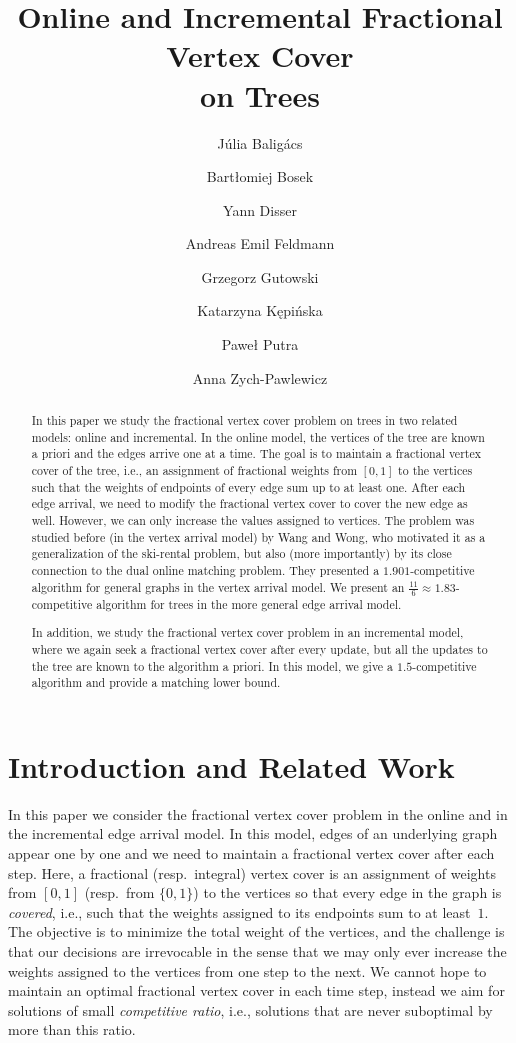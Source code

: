 \documentclass[a4paper,USenglish,cleveref,autoref,thm-restate,pdfa]{lipics-v2021}
\title{Online and Incremental Fractional Vertex Cover\\ on Trees}
\author{Júlia Baligács}
{Department of Computer Science, University of Oxford, United Kingdom}
{jbaligacs@gmail.com}
{https://orcid.org/0000-0003-2654-149X}
{During employment in Warsaw supported by ERC grant BOBR (grant no.~948057).
During employment in Oxford supported by ERC grant CCOO (grant no.~101165139).}
\author{Bart{\l}omiej Bosek}
{Institute~of~Theoretical~Computer~Science, Faculty~of~Mathematics~and~Computer~Science, Jagiellonian~University, Krak{\'o}w, Poland}
{bartlomiej.bosek@uj.edu.pl}
{https://orcid.org/0000-0001-8756-3663}
{}
\author{Yann Disser}
{Department~of~Mathematics, TU Darmstadt, Germany}
{disser@mathematik.tu-darmstadt.de}
{https://orcid.org/0000-0002-2085-0454}
{}
\author{Andreas Emil Feldmann}
{Department of Computer Science, University of Sheffield, United Kingdom}
{feldmann.a.e+web@gmail.com}
{https://orcid.org/0000-0001-6229-5332}
{}
\author{Grzegorz Gutowski}
{Institute~of~Theoretical~Computer~Science, Faculty~of~Mathematics~and~Computer~Science, Jagiellonian~University, Krak{\'o}w, Poland}
{grzegorz.gutowski@uj.edu.pl}
{https://orcid.org/0000-0003-3313-1237}
{}
\author{Katarzyna Kępińska}
{Institute~of~Theoretical~Computer~Science, Faculty~of~Mathematics~and~Computer~Science, Jagiellonian~University, Krak{\'o}w, Poland}
{katarzyna.kepinska@alumni.uj.edu.pl}
{}
{}
\author{Paweł Putra}
{Institute of Informatics, University of Warsaw, Poland}
{p.putra@uw.edu.pl}
{https://orcid.org/0009-0006-3703-680X}
{}
\author{Anna Zych-Pawlewicz}
{Institute of Informatics, University of Warsaw, Poland}
{anka@mimuw.edu.pl}
{https://orcid.org/0000-0002-5361-8969}
{}
\begin{document}
\maketitle
\enlargethispage{\baselineskip}

\begin{abstract}
In this paper we study the fractional vertex cover problem on trees in two related models: online and incremental.
In the online model, the vertices of the tree are known a priori and the edges arrive one at a time. 
The goal is to maintain a fractional vertex cover of the tree, i.e., an assignment of fractional weights from $[0,1]$ to the vertices such that the weights of endpoints of every edge sum up to at least one. 
After each edge arrival, we need to modify the fractional vertex cover to cover the new edge as well. However, we can only increase the values assigned to vertices.
The problem was studied before (in the vertex arrival model) by Wang and Wong, who motivated it as a generalization of the ski-rental problem, but also (more importantly) by its close connection to the dual online matching problem.
They presented a $1.901$-competitive algorithm for general graphs in the vertex arrival model. 
We present an $\frac{11}{6} \approx 1.83$-competitive algorithm for trees in the more general edge arrival model. 

In addition, we study the fractional vertex cover problem in an incremental model, where we again seek a fractional vertex cover after every update, but all the updates to the tree are known to the algorithm a priori. 
In this model, we give a $1.5$-competitive algorithm and provide a matching lower bound.
\end{abstract}

\section{Introduction and Related Work}
In this paper we consider the fractional vertex cover problem in the online and in the incremental edge arrival model.
In this model, edges of an underlying graph appear one by one and we need to maintain a fractional vertex cover after each step.
Here, a fractional (resp.~integral) vertex cover is an assignment of weights from $[0,1]$ (resp.~from $\{0,1\}$) to the vertices so that every edge in the graph is \emph{covered}, i.e., such that the weights assigned to its endpoints sum to at least~$1$.
The objective is to minimize the total weight of the vertices, and the challenge is that our decisions are irrevocable in the sense that we may only ever increase the weights assigned to the vertices from one step to the next.
We cannot hope to maintain an optimal fractional vertex cover in each time step, instead we aim for solutions of small \emph{competitive ratio}, i.e., solutions that are never suboptimal by more than this ratio.
\end{document}
